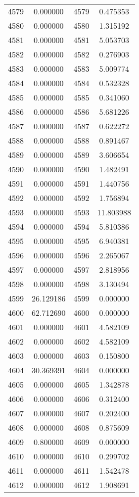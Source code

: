 \documentclass[12pt]{article}
\begin{document}
\begin{longtable}{@{}cccc@{}}
4579 & 0.000000 & 4579 & 0.475353 \\
4580 & 0.000000 & 4580 & 1.315192 \\
4581 & 0.000000 & 4581 & 5.053703 \\
4582 & 0.000000 & 4582 & 0.276903 \\
4583 & 0.000000 & 4583 & 5.009774 \\
4584 & 0.000000 & 4584 & 0.532328 \\
4585 & 0.000000 & 4585 & 0.341060 \\
4586 & 0.000000 & 4586 & 5.681226 \\
4587 & 0.000000 & 4587 & 0.622272 \\
4588 & 0.000000 & 4588 & 0.891467 \\
4589 & 0.000000 & 4589 & 3.606654 \\
4590 & 0.000000 & 4590 & 1.482491 \\
4591 & 0.000000 & 4591 & 1.440756 \\
4592 & 0.000000 & 4592 & 1.756894 \\
4593 & 0.000000 & 4593 & 11.803988 \\
4594 & 0.000000 & 4594 & 5.810386 \\
4595 & 0.000000 & 4595 & 6.940381 \\
4596 & 0.000000 & 4596 & 2.265067 \\
4597 & 0.000000 & 4597 & 2.818956 \\
4598 & 0.000000 & 4598 & 3.130494 \\
4599 & 26.129186 & 4599 & 0.000000 \\
4600 & 62.712690 & 4600 & 0.000000 \\
4601 & 0.000000 & 4601 & 4.582109 \\
4602 & 0.000000 & 4602 & 4.582109 \\
4603 & 0.000000 & 4603 & 0.150800 \\
4604 & 30.369391 & 4604 & 0.000000 \\
4605 & 0.000000 & 4605 & 1.342878 \\
4606 & 0.000000 & 4606 & 0.312400 \\
4607 & 0.000000 & 4607 & 0.202400 \\
4608 & 0.000000 & 4608 & 0.875609 \\
4609 & 0.800000 & 4609 & 0.000000 \\
4610 & 0.000000 & 4610 & 0.299702 \\
4611 & 0.000000 & 4611 & 1.542478 \\
4612 & 0.000000 & 4612 & 1.908691 \\

\end{longtable}
\end{document}
